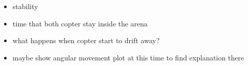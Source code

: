 \begin{itemize}
\item{stability}
\item{time that both copter stay inside the arena}
\item{what happens when copter start to drift away?}
\item{maybe show angular movement plot at this time to find explanation there}
\end{itemize}





%
%
